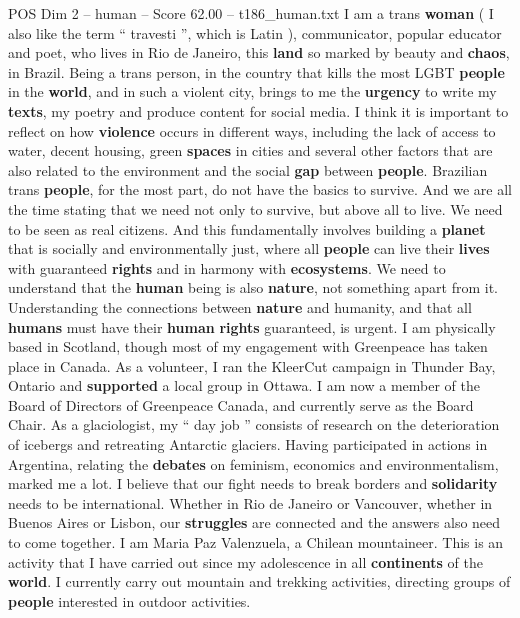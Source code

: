 \begin{textsample}{POS Dim 2 – human – Score 62.00 – t186\_human.txt}
I am a trans \textbf{woman} ( I also like the term “ travesti ”, which is Latin ), communicator, popular educator and poet, who lives in Rio de Janeiro, this \textbf{land} so marked by beauty and \textbf{chaos}, in Brazil.
Being a trans person, in the country that kills the most LGBT \textbf{people} in the \textbf{world}, and in such a violent city, brings to me the \textbf{urgency} to write my \textbf{texts}, my poetry and produce content for social media.
I think it is important to reflect on how \textbf{violence} occurs in different ways, including the lack of access to water, decent housing, green \textbf{spaces} in cities and several other factors that are also related to the environment and the social \textbf{gap} between \textbf{people}.
Brazilian trans \textbf{people}, for the most part, do not have the basics to survive.
And we are all the time stating that we need not only to survive, but above all to live.
We need to be seen as real citizens.
And this fundamentally involves building a \textbf{planet} that is socially and environmentally just, where all \textbf{people} can live their \textbf{lives} with guaranteed \textbf{rights} and in harmony with \textbf{ecosystems}.
We need to understand that the \textbf{human} being is also \textbf{nature}, not something apart from it.
Understanding the connections between \textbf{nature} and humanity, and that all \textbf{humans} must have their \textbf{human} \textbf{rights} guaranteed, is urgent.
I am physically based in Scotland, though most of my engagement with Greenpeace has taken place in Canada.
As a volunteer, I ran the KleerCut campaign in Thunder Bay, Ontario and \textbf{supported} a local group in Ottawa.
I am now a member of the Board of Directors of Greenpeace Canada, and currently serve as the Board Chair.
As a glaciologist, my “ day job ” consists of research on the deterioration of icebergs and retreating Antarctic glaciers.
Having participated in actions in Argentina, relating the \textbf{debates} on feminism, economics and environmentalism, marked me a lot.
I believe that our fight needs to break borders and \textbf{solidarity} needs to be international.
Whether in Rio de Janeiro or Vancouver, whether in Buenos Aires or Lisbon, our \textbf{struggles} are connected and the answers also need to come together.
I am Maria Paz Valenzuela, a Chilean mountaineer.
This is an activity that I have carried out since my adolescence in all \textbf{continents} of the \textbf{world}.
I currently carry out mountain and trekking activities, directing groups of \textbf{people} interested in outdoor activities.

\end{textsample}
